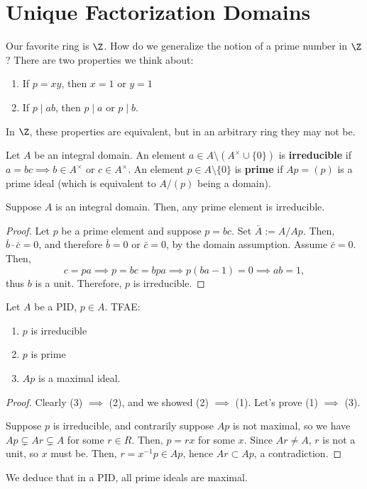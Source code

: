 \section{Unique Factorization Domains}

\begin{notebox*}[Motivation]
    Our favorite ring is $\Z$. How do we generalize the notion of a prime number in $\Z$? There are two properties we think about:
    \begin{enumerate}
        \item If $p=xy$, then $x=1$ or $y=1$
        \item If $p \mid ab$, then $p \mid a$ or $p \mid b$.
    \end{enumerate}
    In $\Z$, these properties are equivalent, but in an arbitrary ring they may not be.
\end{notebox*}

\begin{defn}
    Let $A$ be an integral domain. An element $a \in A \setminus (A^\times \cup \{0\})$ is \textbf{irreducible} if $a=bc \implies b \in A^\times$ or $c \in A^\times$. An element $p \in A\setminus \{0\}$ is \textbf{prime} if $Ap=(p)$ is a prime ideal (which is equivalent to $A/(p)$ being a domain).
\end{defn}

\begin{prop}
    Suppose $A$ is an integral domain. Then, any prime element is irreducible.
\end{prop}

\begin{proof}
    Let $p$ be a prime element and suppose $p=bc$. Set $\bar A:= A/Ap$. Then, $\bar b \cdot \bar c =0$, and therefore $\bar b = 0$ or $\bar c =0$, by the domain assumption. Assume $\bar c =0$. Then,
    $$c = pa \implies p =bc=bpa \implies p(ba-1)=0 \implies ab=1,$$
    thus $b$ is a unit. Therefore, $p$ is irreducible.
\end{proof}

\begin{cor}
    Let $A$ be a PID, $p \in A$. TFAE:
    \begin{enumerate}
        \item $p$ is irreducible
        \item $p$ is prime
        \item $Ap$ is a maximal ideal.
    \end{enumerate}
\end{cor}

\begin{proof}
    Clearly (3) $\implies$ (2), and we showed (2) $\implies$ (1). Let's prove (1) $\implies$ (3).

    Suppose $p$ is irreducible, and contrarily suppose $Ap$ is not maximal, so we have $Ap \subsetneq Ar \subsetneq A$ for some $r \in R$. Then, $p=rx$ for some $x$. Since $Ar \neq A$, $r$ is not a unit, so $x$ must be. Then, $r=x^{-1}p \in Ap$, hence $Ar \subset Ap$, a contradiction.
\end{proof}
\begin{cor}
    We deduce that in a PID, all prime ideals are maximal.
\end{cor}


